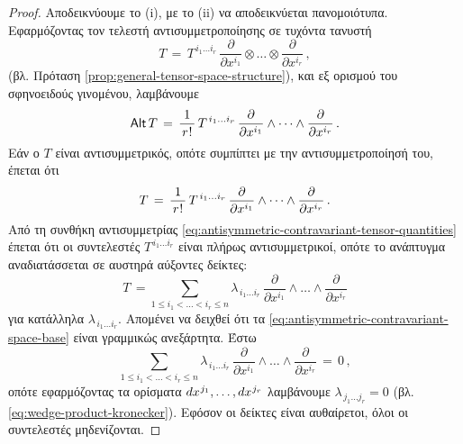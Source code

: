 \documentclass[11pt,a4paper,twoside,openright]{book}
\begin{document}
\begin{proof}
Αποδεικνύουμε το (i), με το (ii) να αποδεικνύεται πανομοιότυπα.
Εφαρμόζοντας τον τελεστή αντισυμμετροποίησης σε τυχόντα τανυστή
\begin{equation*}
T \,=\, T^{\,i_1 \dots i_r} \, \frac{\partial}{\partial x^{i_1}} \otimes \dots \otimes \frac{\partial}{\partial x^{i_r}}\,,
\end{equation*}
(βλ. Πρόταση \ref{prop:general-tensor-space-structure}),
και εξ ορισμού του σφηνοειδούς γινομένου, λαμβάνουμε
\begin{equation*}
\textup{\textsf{Alt}}\,T
\,=\,
\frac{1}{\,r\hspace{.5pt}!\,}
\,
T^{\,i_1 \dots i_r}
\,
\frac{\partial}{\partial x^{i_1}} \wedge \dots \wedge \frac{\partial}{\partial x^{i_r}}\,.
\end{equation*}
Εάν ο $Τ$ είναι αντισυμμετρικός, οπότε συμπίπτει με την αντισυμμετροποίησή του, έπεται ότι
\begin{equation*}
T
\,=\,
\frac{1}{\,r\hspace{.5pt}!\,}
\,
T^{\,i_1 \dots i_r}
\,
\frac{\partial}{\partial x^{i_1}} \wedge \dots \wedge \frac{\partial}{\partial x^{i_r}}\,.
\end{equation*}
Από τη συνθήκη αντισυμμετρίας \eqref{eq:antisymmetric-contravariant-tensor-quantities} έπεται ότι οι συντελεστές $T^{\,i_1 \dots i_r}$ είναι πλήρως αντισυμμετρικοί, οπότε το ανάπτυγμα αναδιατάσσεται σε αυστηρά αύξοντες δείκτες:
\begin{equation}\label{eq:tensor-antisymmetric-expansion-intermediate}
T
\,=
\sum_{1 \le i_1 < \dots < i_r \le n}
\lambda_{\,i_1 \dots i_r}
\,
\frac{\partial}{\partial x^{i_1}} \wedge \dots \wedge \frac{\partial}{\partial x^{i_r}}
\end{equation}
για κατάλληλα $\lambda_{\,i_1 \dots i_r}$.
Απομένει να δειχθεί ότι τα
\eqref{eq:antisymmetric-contravariant-space-base}
είναι γραμμικώς ανεξάρτητα. Έστω
\begin{equation*}
\sum_{1 \le i_1 < \dots < i_r \le n}
\lambda_{\,i_1 \dots i_r}
\,
\frac{\partial}{\partial x^{i_1}} \wedge \dots \wedge \frac{\partial}{\partial x^{i_r}}
\,=\,
0\,,
\end{equation*}
οπότε εφαρμόζοντας τα ορίσματα
$
dx^{\hspace{.5pt}j_1}, \dots, dx^{\hspace{.5pt}j_r}
$
λαμβάνουμε
$\lambda_{\,j_1 \dots j_r} = 0$
(βλ. \eqref{eq:wedge-product-kronecker}).
Eφόσον οι δείκτες είναι αυθαίρετοι, όλοι οι συντελεστές μηδενίζονται.
\end{proof}
\end{document}
